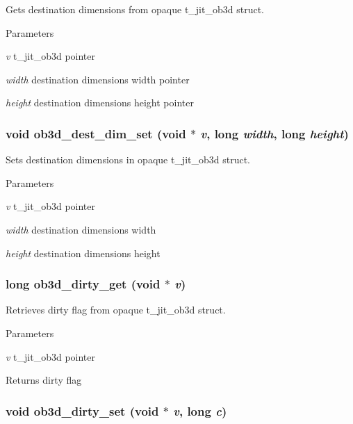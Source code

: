 Gets destination dimensions from opaque t\_\-jit\_\-ob3d struct. 
\begin{DoxyParams}{Parameters}
\item[{\em v}]t\_\-jit\_\-ob3d pointer \item[{\em width}]destination dimensions width pointer \item[{\em height}]destination dimensions height pointer \end{DoxyParams}
\hypertarget{group__ob3dmod_ga354e6daa1b458570e2528e12819b0c2a}{
\subsubsection[{ob3d\_\-dest\_\-dim\_\-set}]{\setlength{\rightskip}{0pt plus 5cm}void ob3d\_\-dest\_\-dim\_\-set (void $\ast$ {\em v}, \/  long {\em width}, \/  long {\em height})}}
\label{group__ob3dmod_ga354e6daa1b458570e2528e12819b0c2a}


Sets destination dimensions in opaque t\_\-jit\_\-ob3d struct. 
\begin{DoxyParams}{Parameters}
\item[{\em v}]t\_\-jit\_\-ob3d pointer \item[{\em width}]destination dimensions width \item[{\em height}]destination dimensions height \end{DoxyParams}
\hypertarget{group__ob3dmod_ga65a7339c9100afefc290d51c083467ab}{
\subsubsection[{ob3d\_\-dirty\_\-get}]{\setlength{\rightskip}{0pt plus 5cm}long ob3d\_\-dirty\_\-get (void $\ast$ {\em v})}}
\label{group__ob3dmod_ga65a7339c9100afefc290d51c083467ab}


Retrieves dirty flag from opaque t\_\-jit\_\-ob3d struct. 
\begin{DoxyParams}{Parameters}
\item[{\em v}]t\_\-jit\_\-ob3d pointer\end{DoxyParams}
\begin{DoxyReturn}{Returns}
dirty flag 
\end{DoxyReturn}
\hypertarget{group__ob3dmod_ga8e025904830302e5815a1396c87aeb03}{
\subsubsection[{ob3d\_\-dirty\_\-set}]{\setlength{\rightskip}{0pt plus 5cm}void ob3d\_\-dirty\_\-set (void $\ast$ {\em v}, \/  long {\em c})}}
\label{group__ob3dmod_ga8e025904830302e5815a1396c87aeb03}


